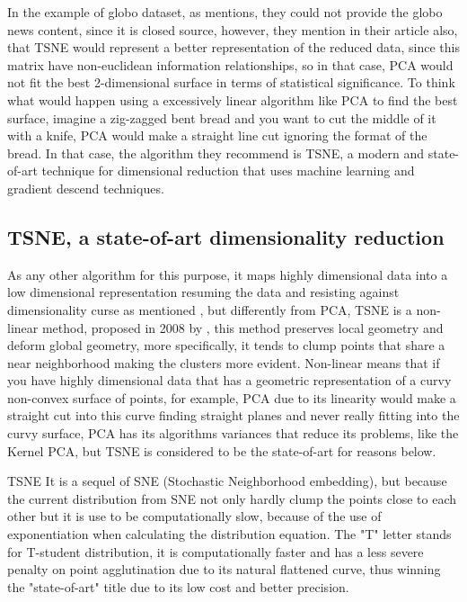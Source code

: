 \documentclass[ecp,tc,english]{iiufrgs}
\begin{document}
        In the example of globo dataset, as \cite{deSouzaPereiraMoreira:2018:CDL:3240323.3240331} mentions, they could not provide the globo news content, since it is closed source, however, they mention in their article also, that TSNE would represent a better representation of the reduced data, since this matrix have non-euclidean information relationships, so in that case, PCA would not fit the best 2-dimensional surface in terms of statistical significance.
        To think what would happen using a excessively linear algorithm like PCA to find the best surface, imagine a zig-zagged bent bread and you want to cut the middle of it with a knife, PCA would make a straight line cut ignoring the format of the bread. In that case, the algorithm they recommend is TSNE, a modern and state-of-art technique for dimensional reduction that uses machine learning and gradient descend techniques.
        \newline
        
        \subsection{TSNE, a state-of-art dimensionality reduction}
        As any other algorithm for this purpose, it maps highly dimensional data into a low dimensional representation resuming the data and resisting against dimensionality curse as mentioned \cite{10.1093/imamat/24.1.59}, but differently from PCA, TSNE is a non-linear method, proposed in 2008 by \cite{vanDerMaaten2008}, this method preserves local geometry and deform global geometry, more specifically, it tends to clump points that share a near neighborhood making the clusters more evident.
        Non-linear means that if you have highly dimensional data that has a geometric representation of a curvy non-convex surface of points, for example, PCA due to its linearity would make a straight cut into this curve finding straight planes and never really fitting into the curvy surface, PCA has its algorithms variances that reduce its problems, like the Kernel PCA, but TSNE is considered to be the state-of-art for reasons below.

        TSNE It is a sequel of SNE (Stochastic Neighborhood embedding), but because the current distribution from SNE not only hardly clump the points close to each other but it is use to be computationally slow, because of the use of exponentiation when calculating the distribution equation.
        The "T" letter stands for T-student distribution, it is computationally faster and has a less severe penalty on point agglutination due to its natural flattened curve, thus winning the "state-of-art" title due to its low cost and better precision.
\end{document}
